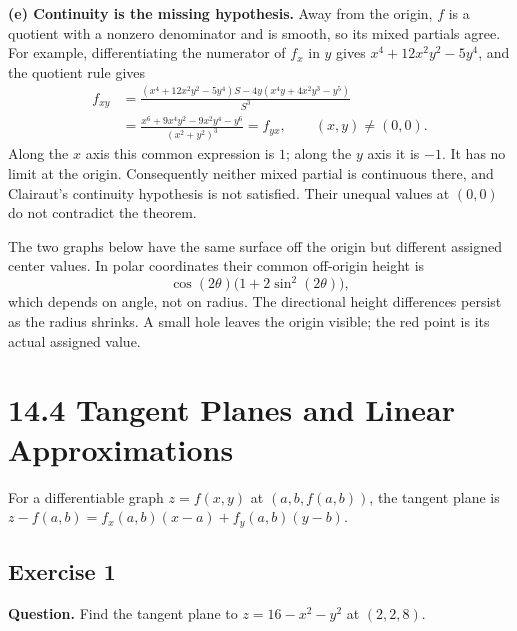\documentclass[11pt]{article}
\newcommand{\ex}[1]{\Needspace{8\baselineskip}\subsection*{Exercise #1}}
\begin{document}
\textbf{(e) Continuity is the missing hypothesis.} Away from the origin, $f$ is a quotient with a nonzero denominator and is smooth, so its mixed partials agree. For example, differentiating the numerator of $f_x$ in $y$ gives $x^4+12x^2y^2-5y^4$, and the quotient rule gives
\begin{align*}
f_{xy}&=\frac{(x^4+12x^2y^2-5y^4)S-4y(x^4y+4x^2y^3-y^5)}{S^3}\\
&=\frac{x^6+9x^4y^2-9x^2y^4-y^6}{(x^2+y^2)^3}
=f_{yx},\qquad (x,y)\ne(0,0).
\end{align*}
Along the $x$ axis this common expression is $1$; along the $y$ axis it is $-1$. It has no limit at the origin. Consequently neither mixed partial is continuous there, and Clairaut's continuity hypothesis is not satisfied. Their unequal values at $(0,0)$ do not contradict the theorem.

The two graphs below have the same surface off the origin but different assigned center values. In polar coordinates their common off-origin height is
\[\cos(2\theta)\bigl(1+2\sin^2(2\theta)\bigr),\]
which depends on angle, not on radius. The directional height differences persist as the radius shrinks. A small hole leaves the origin visible; the red point is its actual assigned value.
\begin{minipage}{\linewidth}
\begin{center}\end{center}
\begin{center}\end{center}
\end{minipage}
\clearpage\section*{14.4 Tangent Planes and Linear Approximations}
\noindent For a differentiable graph $z=f(x,y)$ at $(a,b,f(a,b))$, the tangent plane is $z-f(a,b)=f_x(a,b)(x-a)+f_y(a,b)(y-b)$.
\ex{1}
\textbf{Question.} Find the tangent plane to $z=16-x^2-y^2$ at $(2,2,8)$.
\end{document}
